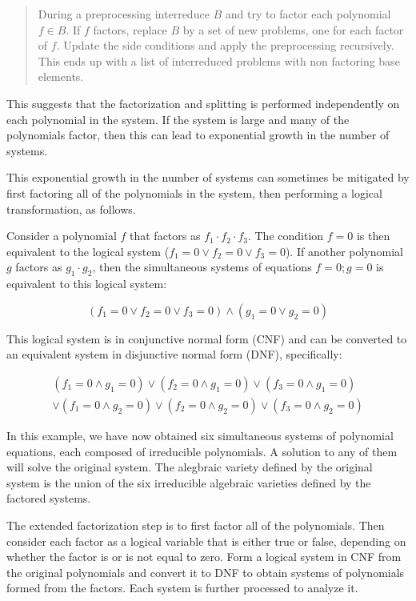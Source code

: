 \documentclass{article}
\begin{document}
\begin{quote}
During a preprocessing interreduce $B$ and try to factor each polynomial $f \in B$. If $f$ factors,
replace $B$ by a set of new problems, one for each factor of $f$. Update the side conditions
and apply the preprocessing recursively. This ends up with a list of interreduced problems
with non factoring base elements.
\end{quote}

This suggests that the factorization and splitting is performed independently on each
polynomial in the system.  If the system is large and many of the polynomials factor,
then this can lead to exponential growth in the number of systems.

This exponential growth in the number of systems can sometimes be mitigated
by first factoring all of the polynomials in the system, then performing
a logical transformation, as follows.

Consider a polynomial $f$ that factors as $f_1\cdot f_2\cdot f_3$.
The condition $f=0$ is then equivalent to the logical system ($f_1=0 \vee f_2=0 \vee f_3=0$).
If another polynomial $g$ factors as $g_1 \cdot g_2$, then the simultaneous
systems of equations $f=0; g=0$ is equivalent to this logical system:

\begin{equation}
(f_1=0 \vee f_2=0 \vee f_3=0) \wedge (g_1 = 0 \vee g_2 = 0)
\end{equation}

This logical system is in conjunctive normal form (CNF) and can be
converted to an equivalent system in disjunctive normal form (DNF), specifically:

\begin{equation}
\begin{split}
(f_1=0 \wedge g_1 = 0) \vee (f_2=0 \wedge g_1 = 0) \vee (f_3=0 \wedge g_1 = 0) \\
\vee (f_1=0 \wedge g_2 = 0) \vee (f_2=0 \wedge g_2 = 0) \vee (f_3=0 \wedge g_2 = 0)
\end{split}
\end{equation}

In this example, we have now obtained six simultaneous systems of polynomial equations,
each composed of irreducible polynomials.  A solution to any of them will solve the
original system.  The alegbraic variety defined by the original system is the union
of the six irreducible algebraic varieties defined by the factored systems.

The extended factorization step is to first factor all of the polynomials.  Then consider
each factor as a logical variable that is either true or false, depending on
whether the factor is or is not equal to zero.  Form a logical system in CNF
from the original polynomials and convert it to DNF to obtain systems of polynomials
formed from the factors.  Each system is further processed to analyze it.
\end{document}
